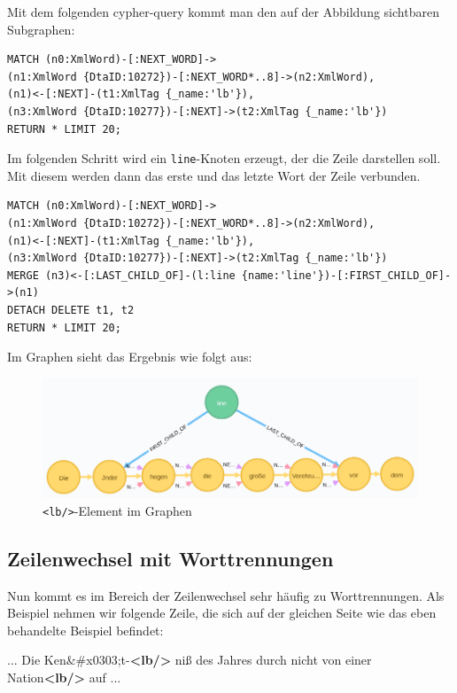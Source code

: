 \documentclass[ngerman,]{scrreprt}
\newenvironment{Shaded}{}{}
\newcommand{\KeywordTok}[1]{\textcolor[rgb]{0.00,0.44,0.13}{\textbf{#1}}}
\newcommand{\DecValTok}[1]{\textcolor[rgb]{0.25,0.63,0.44}{#1}}
\newcommand{\NormalTok}[1]{#1}
\begin{document}
Mit dem folgenden cypher-query kommt man den auf der Abbildung sichtbaren Subgraphen:

\begin{verbatim}
MATCH (n0:XmlWord)-[:NEXT_WORD]->
(n1:XmlWord {DtaID:10272})-[:NEXT_WORD*..8]->(n2:XmlWord),
(n1)<-[:NEXT]-(t1:XmlTag {_name:'lb'}),
(n3:XmlWord {DtaID:10277})-[:NEXT]->(t2:XmlTag {_name:'lb'})
RETURN * LIMIT 20;
\end{verbatim}

Im folgenden Schritt wird ein \texttt{line}-Knoten erzeugt, der die Zeile darstellen soll. Mit diesem werden dann das erste und das letzte Wort der Zeile verbunden.

\begin{verbatim}
MATCH (n0:XmlWord)-[:NEXT_WORD]->
(n1:XmlWord {DtaID:10272})-[:NEXT_WORD*..8]->(n2:XmlWord),
(n1)<-[:NEXT]-(t1:XmlTag {_name:'lb'}),
(n3:XmlWord {DtaID:10277})-[:NEXT]->(t2:XmlTag {_name:'lb'})
MERGE (n3)<-[:LAST_CHILD_OF]-(l:line {name:'line'})-[:FIRST_CHILD_OF]->(n1)
DETACH DELETE t1, t2
RETURN * LIMIT 20;
\end{verbatim}

Im Graphen sieht das Ergebnis wie folgt aus:

\begin{figure}
\centering
\includegraphics{Bilder/TEI2Graph/lb-to-line.png}
\caption{\texttt{\textless{}lb/\textgreater{}}-Element im Graphen}
\end{figure}

\subsection{Zeilenwechsel mit Worttrennungen}\label{zeilenwechsel-mit-worttrennungen}

Nun kommt es im Bereich der Zeilenwechsel sehr häufig zu Worttrennungen. Als Beispiel nehmen wir folgende Zeile, die sich auf der gleichen Seite wie das eben behandelte Beispiel befindet:

\begin{Shaded}
\begin{Highlighting}[]
\NormalTok{... Die Ken}\DecValTok{&#x0303;}\NormalTok{t-}\KeywordTok{<lb/>}
\NormalTok{niß des Jahres durch nicht von einer Nation}\KeywordTok{<lb/>}
\NormalTok{auf ...}
\end{Highlighting}
\end{Shaded}
\end{document}
